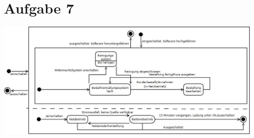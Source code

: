 \section*{Aufgabe 7}
\includegraphics*[width=\textwidth,height=\textheight,keepaspectratio]{Aufgabe7.jpeg}

